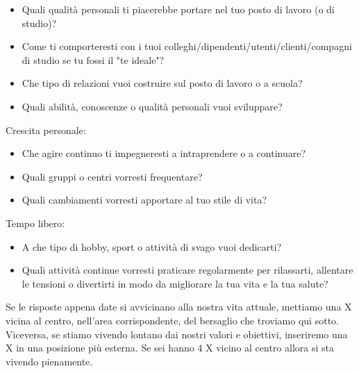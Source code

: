 \documentclass[12pt]{book} %
\begin{document}
\begin{itemize}
\item Quali qualità personali ti piacerebbe portare nel tuo posto di lavoro (o di studio)? 
\item Come ti comporteresti con i tuoi colleghi/dipendenti/utenti/clienti/compagni di studio se tu fossi il
"te ideale"? 
\item Che tipo di relazioni vuoi costruire sul posto di lavoro o a scuola? 
\item Quali abilità, conoscenze o qualità personali vuoi sviluppare?
\end{itemize}
Crescita personale:

\begin{itemize}
\item Che agire continuo ti impegneresti a intraprendere o a continuare? 
\item Quali gruppi o centri vorresti frequentare? 
\item Quali cambiamenti vorresti apportare al tuo stile di vita?
\end{itemize}
Tempo libero: 

\begin{itemize}
\item A che tipo di hobby, sport o attività di svago vuoi dedicarti? 
\item Quali attività continue vorresti praticare regolarmente per rilassarti, allentare le tensioni o divertirti in modo
da migliorare la tua vita e la tua salute?
\end{itemize}
Se le risposte appena date si avvicinano alla nostra vita attuale, mettiamo una X vicina al centro,
nell'area corrispondente, del bersaglio che troviamo qui sotto. Viceversa, se stiamo vivendo
lontano dai nostri valori e obiettivi, inseriremo una X in una posizione più esterna. Se sei hanno 4 X vicino al centro
allora si sta vivendo pienamente.
\end{document}
